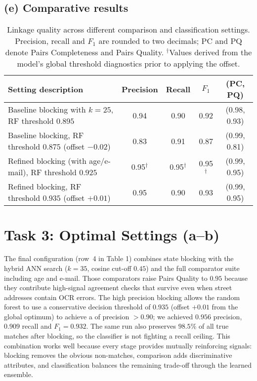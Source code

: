 \documentclass[11pt]{article}
\begin{document}
\subsection*{(e) Comparative results}
\begin{table}[h]
\centering
\begin{tabular}{p{}cccc}
\toprule
Setting description & Precision & Recall & $F_{1}$ & (PC, PQ) \\
\midrule
Baseline blocking with $k{=}25$, RF threshold $0.895$ & 0.94 & 0.90 & 0.92 & (0.98, 0.93) \\
Baseline blocking, RF threshold $0.875$ (offset $-0.02$) & 0.83 & 0.91 & 0.87 & (0.99, 0.81) \\
Refined blocking (with age/e-mail), RF threshold $0.925$ & 0.95$^{\dagger}$ & 0.95$^{\dagger}$ & 0.95$^{\dagger}$ & (0.99, 0.95) \\
Refined blocking, RF threshold $0.935$ (offset $+0.01$) & 0.95 & 0.90 & 0.93 & (0.99, 0.95) \\
\bottomrule
\end{tabular}
\caption{Linkage quality across different comparison and classification settings. Precision, recall and $F_{1}$ are rounded to two decimals; PC and PQ denote Pairs Completeness and Pairs Quality. $^{\dagger}$Values derived from the model's global threshold diagnostics prior to applying the offset.}
\end{table}

\section*{Task 3: Optimal Settings (a--b)}
The final configuration (row~4 in Table 1) combines state blocking with the hybrid ANN search ($k{=}35$, cosine cut-off $0.45$) and the full comparator suite including age and e-mail. Those comparators raise Pairs Quality to $0.95$ because they contribute high-signal agreement checks that survive even when street addresses contain OCR errors. The high precision blocking allows the random forest to use a conservative decision threshold of $0.935$ (offset $+0.01$ from the global optimum) to achieve a of precision $>0.90$; we achieved $0.956$ precision, $0.909$ recall and $F_{1} = 0.932$. The same run also preserves $98.5\%$ of all true matches after blocking, so the classifier is not fighting a recall ceiling. This combination works well because every stage provides mutually reinforcing signals: blocking removes the obvious non-matches, comparison adds discriminative attributes, and classification balances the remaining trade-off through the learned ensemble.
\end{document}
